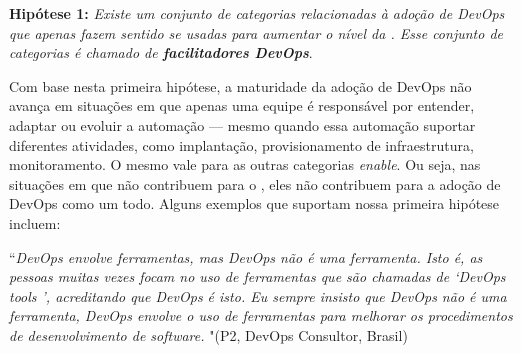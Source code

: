 \begin{mh}
{\bf Hipótese 1:} {\it Existe um conjunto de categorias relacionadas à adoção de
{\it DevOps} que apenas fazem sentido se usadas para aumentar o nível da \cc.
Esse conjunto de categorias é chamado de {\bf facilitadores DevOps}}.
\end{mh}

\iffalse
Com base nesta primeira hipótese, a maturidade da adoção de DevOps não
avança em situações em que apenas uma equipe é responsável por entender, adaptar ou
evoluir a automação --- mesmo quando essa automação suportar diferentes atividades, como implantação, provisionamento de infraestrutura,
monitoramento. O mesmo vale para as outras categorias \emph{enable}. Ou seja, nas situações em que
 não contribuem para
o \cc, eles não contribuem para a adoção de DevOps como um todo. Alguns exemplos
que suportam nossa primeira hipótese incluem:



\begin{mq}
``\emph{DevOps envolve ferramentas, mas DevOps não é uma ferramenta. Isto é, as pessoas muitas vezes
focam no uso de ferramentas que são chamadas de `DevOps tools ', acreditando que DevOps é
isto. Eu sempre insisto que DevOps não é uma ferramenta, DevOps envolve o uso de
ferramentas para melhorar os procedimentos de desenvolvimento de software.} "(P2, DevOps
Consultor, Brasil)
\end{mq}



